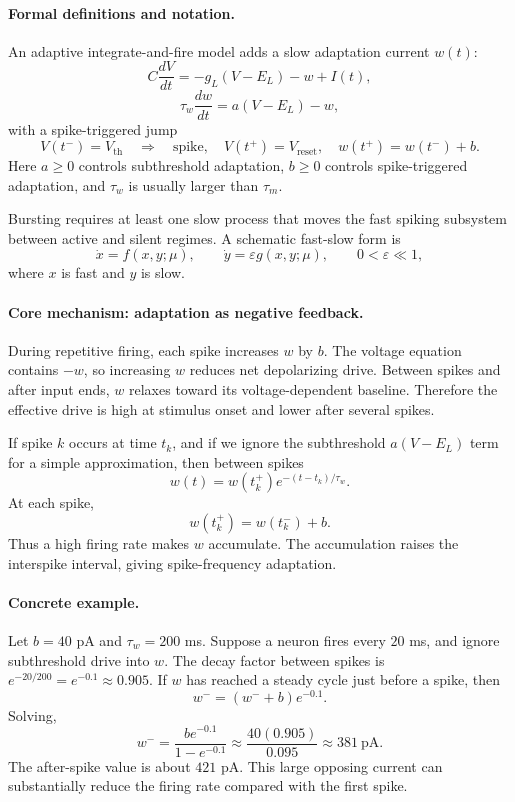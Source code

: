 \paragraph{Formal definitions and notation.}
An adaptive integrate-and-fire model adds a slow adaptation current \(w(t)\):
\[
C\frac{dV}{dt}=-g_L(V-E_L)-w+I(t),
\]
\[
\tau_w\frac{dw}{dt}=a(V-E_L)-w,
\]
with a spike-triggered jump
\[
V(t^-)=V_{\mathrm{th}}
\quad\Longrightarrow\quad
\text{spike},\quad V(t^+)=V_{\mathrm{reset}},\quad w(t^+)=w(t^-)+b.
\]
Here \(a\geq0\) controls subthreshold adaptation, \(b\geq0\) controls spike-triggered adaptation, and \(\tau_w\) is usually larger than \(\tau_m\).

Bursting requires at least one slow process that moves the fast spiking subsystem between active and silent regimes. A schematic fast-slow form is
\[
\dot x=f(x,y;\mu),\qquad
\dot y=\varepsilon g(x,y;\mu),\qquad 0<\varepsilon\ll1,
\]
where \(x\) is fast and \(y\) is slow.

\paragraph{Core mechanism: adaptation as negative feedback.}
During repetitive firing, each spike increases \(w\) by \(b\). The voltage equation contains \(-w\), so increasing \(w\) reduces net depolarizing drive. Between spikes and after input ends, \(w\) relaxes toward its voltage-dependent baseline. Therefore the effective drive is high at stimulus onset and lower after several spikes.

If spike \(k\) occurs at time \(t_k\), and if we ignore the subthreshold \(a(V-E_L)\) term for a simple approximation, then between spikes
\[
w(t)=w(t_k^+)e^{-(t-t_k)/\tau_w}.
\]
At each spike,
\[
w(t_k^+)=w(t_k^-)+b.
\]
Thus a high firing rate makes \(w\) accumulate. The accumulation raises the interspike interval, giving spike-frequency adaptation.

\paragraph{Concrete example.}
Let \(b=40\) pA and \(\tau_w=200\) ms. Suppose a neuron fires every \(20\) ms, and ignore subthreshold drive into \(w\). The decay factor between spikes is \(e^{-20/200}=e^{-0.1}\approx0.905\). If \(w\) has reached a steady cycle just before a spike, then
\[
w^- = (w^-+b)e^{-0.1}.
\]
Solving,
\[
w^-=\frac{b e^{-0.1}}{1-e^{-0.1}}\approx
\frac{40(0.905)}{0.095}\approx381\ \mathrm{pA}.
\]
The after-spike value is about \(421\) pA. This large opposing current can substantially reduce the firing rate compared with the first spike.

